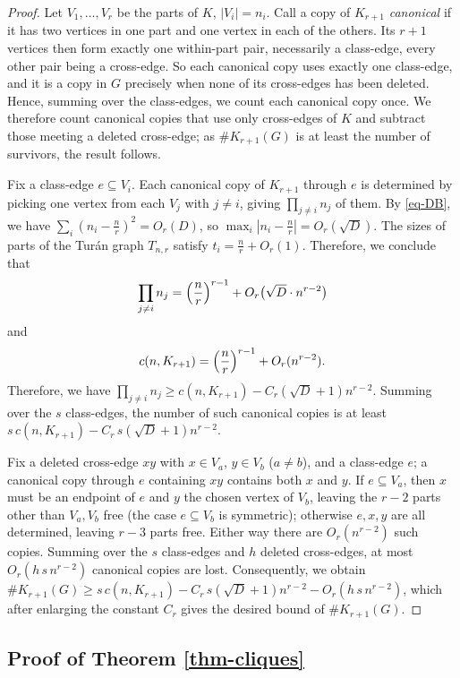 \documentclass[11pt,a4paper]{article}
\theoremstyle{definition}
\theoremstyle{plain}
\renewcommand{\ge}{\geqslant}
\begin{document}
\begin{proof}
Let $V_1,\ldots,V_r$ be the parts of $K$, $|V_i|=n_i$. Call a copy of $K_{r+1}$
\emph{canonical} if it has two vertices in one part and one vertex in each of the others.
Its $r+1$ vertices then form exactly one within-part pair, necessarily a class-edge, every
other pair being a cross-edge. So each canonical copy uses exactly one class-edge, and it is a copy in $G$
precisely when none of its cross-edges has been deleted. Hence, 
summing over the class-edges, we count each canonical copy once.  
We therefore count canonical copies that use only cross-edges of $K$ and subtract
those meeting a deleted cross-edge; as $\texttt{\#}K_{r+1}(G)$ is at least the number of survivors, the
result follows.


Fix a class-edge $e\subseteq V_i$. Each canonical copy of $K_{r+1}$ through $e$ is determined by picking one vertex
from each $V_j$ with $j\ne i$, giving $\prod_{j\ne i}n_j$ of them. By \eqref{eq-DB}, we have 
$\sum_i(n_i-\tfrac nr)^2=O_r(D)$, so $\max_{i} |n_i -\tfrac nr| =O_r(\sqrt D)$. The sizes of parts of 
the Tur\'an graph $T_{n,r}$ satisfy $t_i=\tfrac nr+O_r(1)$. Therefore, we conclude that 
\[
        \prod_{j\ne i}n_j=\Bigl(\frac nr\Bigr)^{r-1}+O_r\bigl( \sqrt D\cdot n^{r-2}\bigr) 
\]
and
\[   c(n,K_{r+1})=\Bigl(\frac nr\Bigr)^{r-1}+O_r(n^{r-2}). \]
Therefore, we have $\prod_{j\ne i}n_j\ge c(n,K_{r+1})-C_r(\sqrt D+1)n^{r-2}$. Summing over the $s$
class-edges, the number of such canonical copies is at least
$s\,c(n,K_{r+1})-C_r\,s(\sqrt D+1)n^{r-2}$.

Fix a deleted cross-edge $xy$ with $x\in V_a$, $y\in V_b$ ($a\ne b$), and a class-edge $e$; a
canonical copy through $e$ containing $xy$ contains both $x$ and $y$. If $e\subseteq V_a$,
then $x$ must be an endpoint of $e$ and $y$ the chosen vertex of $V_b$, leaving the $r-2$
parts other than $V_a,V_b$ free (the case $e\subseteq V_b$ is symmetric); otherwise $e,x,y$
are all determined, leaving $r-3$ parts free. Either way there are $O_r(n^{r-2})$ such copies.
Summing over the $s$ class-edges and $h$ deleted cross-edges, at most $O_r(h\,s\,n^{r-2})$ canonical copies are lost. 
Consequently,  we obtain 
$\texttt{\#} K_{r+1}(G)\ge s\,c(n,K_{r+1})-C_r\,s(\sqrt D+1)n^{r-2}-O_r(h\,s\,n^{r-2})$, which
after enlarging the constant $C_r$ gives the desired bound of $\texttt{\#} K_{r+1}(G)$.
\end{proof} 



\subsection{Proof of Theorem \ref{thm-cliques}} 
\end{document}
